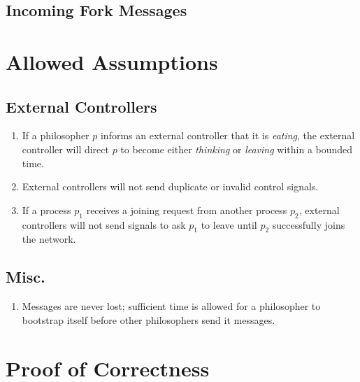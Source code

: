 \documentclass[11pt]{article}
\begin{document}
\subsection{Incoming Fork Messages}



\section{Allowed Assumptions}

\subsection{External Controllers}
\begin{enumerate}[E1]
\item If a philosopher $p$ informs an external controller that it is \emph{eating}, the external controller will direct $p$ to become either \emph{thinking} or \emph{leaving} within a bounded time.

\item External controllers will not send duplicate or invalid control signals.

\item \label{Assump:E_guarantees_nodes_entering_network} If a process $p_1$ receives a joining request from another process $p_2$, external controllers will not send signals to ask $p_1$ to leave until $p_2$ successfully joins the network.
\end{enumerate}

\subsection{Misc.}
\begin{enumerate}[E4]
\item Messages are never lost; sufficient time is allowed for a philosopher to bootstrap itself before other philosophers send it messages.
\end{enumerate}


\section{Proof of Correctness}
\end{document}
